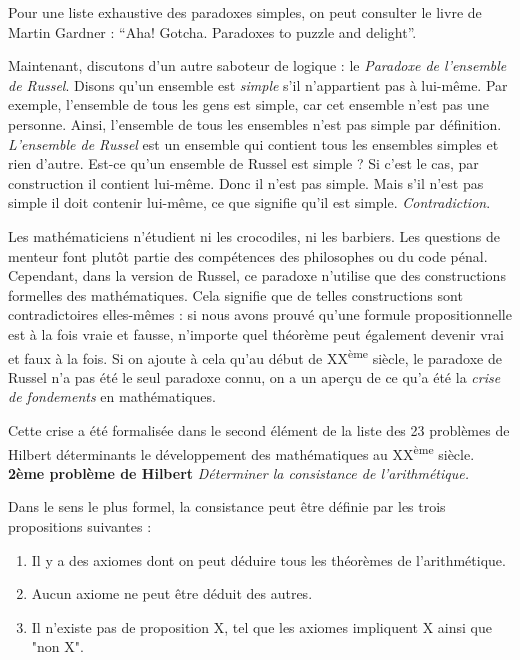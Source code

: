 Pour une liste exhaustive des paradoxes simples, on peut consulter le livre de Martin Gardner : ``Aha! Gotcha. Paradoxes to puzzle and delight''.

Maintenant, discutons d'un autre saboteur de logique : le \emph{Paradoxe de l'ensemble de Russel}.
Disons qu'un ensemble est \emph{simple} s'il n'appartient pas à lui-même. Par exemple, l'ensemble de tous les gens est simple, car cet ensemble n'est pas une personne. Ainsi, l'ensemble de tous les ensembles n'est pas simple par définition. \emph{L'ensemble de Russel} est un ensemble qui contient tous les ensembles simples et rien d'autre.
Est-ce qu'un ensemble de Russel est simple ? Si c'est le cas, par construction il contient lui-même. Donc il n'est pas simple. Mais s'il n'est pas simple il doit contenir lui-même, ce que signifie qu'il est simple. \emph{Contradiction}.

Les mathématiciens n'étudient ni les crocodiles, ni les barbiers.
Les questions de menteur font plutôt partie des compétences des philosophes ou du code pénal.
Cependant, dans la version de Russel, ce paradoxe n'utilise que des constructions formelles des mathématiques. Cela signifie que de telles constructions sont contradictoires elles-mêmes : si nous avons prouvé qu'une formule propositionnelle est à la fois vraie et fausse, n'importe quel théorème peut également devenir vrai et faux à la fois.
Si on ajoute à cela qu'au début de XX\textsuperscript{ème} siècle, le paradoxe de Russel n'a pas été le seul paradoxe connu, on a un aperçu de ce qu'a été la \emph{crise de fondements} en mathématiques.

Cette crise a été formalisée dans le second élément de la liste des 23 problèmes de Hilbert déterminants le développement des mathématiques au XX\textsuperscript{ème} siècle. \\
\textbf{2ème problème de Hilbert}
\textit{Déterminer la consistance de l'arithmétique.}

Dans le sens le plus formel, la consistance peut être définie par les trois propositions suivantes :

\begin{enumerate}
	\item Il y a des axiomes dont on peut déduire tous les théorèmes de l'arithmétique.
	\item Aucun axiome ne peut être déduit des autres.
	\item Il n'existe pas de proposition X, tel que les axiomes impliquent X ainsi que "non X".
\end{enumerate}

